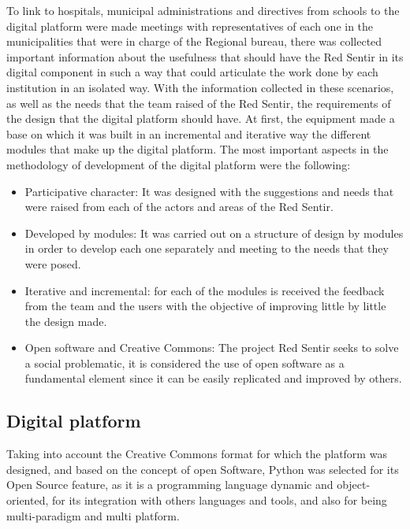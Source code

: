 \documentclass[journal,transmag]{IEEEtran}
\begin{document}
To link to hospitals, municipal administrations and directives from schools to the digital platform were made meetings with representatives of each one in the municipalities that were in charge of the Regional bureau, there was collected important information about the usefulness that should have the Red Sentir in its digital component in such a way that could articulate the work done by each institution in an isolated way. With the information collected in these scenarios, as well as the needs that the team raised of the Red Sentir, the requirements of the design that the digital platform should have. At first, the equipment made a base on which it was built in an incremental and iterative way the different modules that make up the digital platform. The most important aspects in the methodology of development of the digital platform were the following:

\begin{itemize}
\item Participative character: It was designed with the suggestions and needs that were raised from each of the actors and areas of the Red Sentir.

\item Developed by modules: It was carried out on a structure of design by modules in order to develop each one separately and meeting to the needs that they were posed.

\item Iterative and incremental: for each of the modules is received the feedback from the team and the users with the objective of improving little by little the design made.

\item Open software and Creative Commons: The project Red Sentir seeks to solve a social problematic, it is considered the use of open software as a fundamental element since it can be easily replicated and improved by others.
\end{itemize}

\subsection{Digital platform}
Taking into account the Creative Commons format for which the platform was designed, and based on the concept of open Software, Python was selected for its Open Source feature, as it is a programming language dynamic and object-oriented, for its integration with others languages and tools, and also for being multi-paradigm and multi platform.
\end{document}
